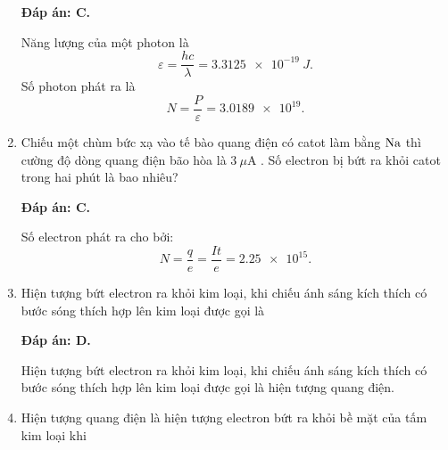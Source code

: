 \begin{enumerate}[label=\bfseries Câu \arabic*:]
	\loigiai
	{		\textbf{Đáp án: C.}

Năng lượng của một photon là
$$
	\varepsilon = \dfrac{hc}{\lambda} = \SI{3,3125 e-19}{J}.
$$		
Số photon phát ra là
$$
	N = \dfrac{P}{\varepsilon} = \num{3,0189 e19}.
$$
		
	}
	
	\item {} 
	
	\cauhoi
	{Chiếu một chùm bức xạ vào tế bào quang điện có catot làm bằng $\ce{Na}$ thì cường độ dòng quang điện bão hòa là $3\ \mu\text{A}$ . Số electron bị bứt ra khỏi catot trong hai phút là bao nhiêu?
	}
	
	\loigiai
	{		\textbf{Đáp án: C.}
		
Số electron phát ra cho bởi:
$$
	N = \dfrac{q}{e} = \dfrac{It}{e} = \num{2,25 e15}.
$$
		
	}
	
\item {} 
	
	\cauhoi
	{Hiện tượng bứt electron ra khỏi kim loại, khi chiếu ánh sáng kích thích có bước sóng thích hợp lên kim loại được gọi là
	}
	
	\loigiai
	{		\textbf{Đáp án: D.}
		
Hiện tượng bứt electron ra khỏi kim loại, khi chiếu ánh sáng kích thích có bước sóng thích hợp lên kim loại được gọi là hiện tượng quang điện. 
		
	}
	
	\item {} 
	
	\cauhoi
	{Hiện tượng quang điện là hiện tượng electron bứt ra khỏi bề mặt của tấm kim loại khi 
	}
	

\end{enumerate}
